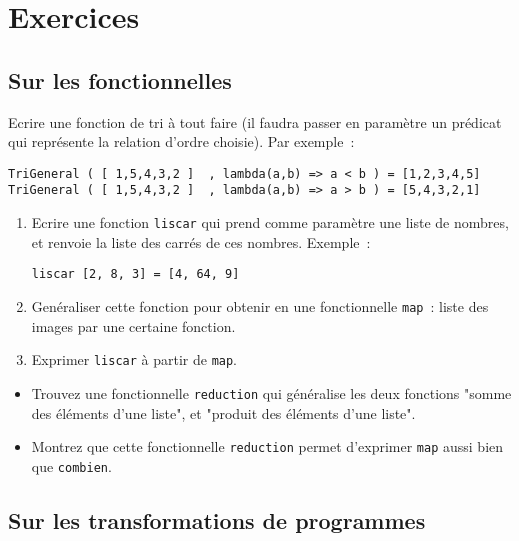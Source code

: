 \section{Exercices}

\subsection{Sur les fonctionnelles}
\begin{exercice}
 Ecrire une fonction de tri à tout faire (il faudra passer en paramètre un prédicat qui représente la relation d'ordre choisie). Par exemple~:
\begin{verbatim}
TriGeneral ( [ 1,5,4,3,2 ]  , lambda(a,b) => a < b ) = [1,2,3,4,5]
TriGeneral ( [ 1,5,4,3,2 ]  , lambda(a,b) => a > b ) = [5,4,3,2,1]
\end{verbatim}
\end{exercice}

\begin{exercice}
\begin{enumerate}
\item Ecrire une fonction \texttt{liscar} qui prend comme paramètre une
liste de nombres, et renvoie la liste des carrés de ces
nombres. Exemple~:
\begin{verbatim}
liscar [2, 8, 3] = [4, 64, 9]
\end{verbatim}
\item
Genéraliser cette fonction pour obtenir en une fonctionnelle \texttt{map}~:
liste des images par une certaine fonction.
\item Exprimer \texttt{liscar} à partir de \texttt{map}.
\end{enumerate}
\end{exercice}

\begin{exercice}
\begin{itemize}
\item 
   Trouvez une fonctionnelle \texttt{reduction} qui généralise les
   deux fonctions "somme des éléments d'une liste", et "produit des
   éléments d'une liste".
\item
 Montrez que cette fonctionnelle \texttt{reduction} permet
 d'exprimer \texttt{map} aussi bien que \texttt{combien}.
\end{itemize}
\end{exercice}


\subsection{Sur les transformations de programmes}


